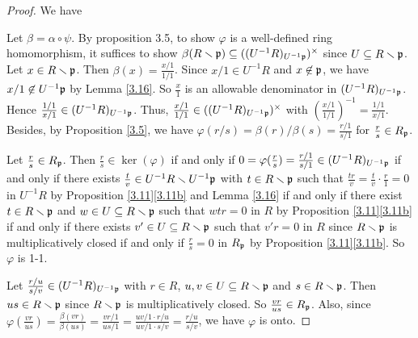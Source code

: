 \begin{proof}
    We have 
    \begin{center}
    \end{center}
    Let $\beta = \alpha \circ \psi$. By proposition 3.5, to show $\varphi$ is a well-defined ring homomorphism, it suffices to show $\beta(R \smallsetminus \mathfrak{p}) \subseteq ((U^{-1}R)_{U^{-1}\mathfrak{p}})^{\times}$ since $U \subseteq R \smallsetminus \mathfrak{p}$. Let $x \in R \smallsetminus \mathfrak{p}$. Then $\beta(x) = \frac{x/1}{1/1}$. Since $x/1 \in U^{-1}R$ and $x \not \in \mathfrak{p}$, we have $x/1 \not \in U^{-1}\mathfrak{p}$ by Lemma \ref{3.16}. So $\frac{x}{1}$ is an allowable denominator in $(U^{-1}R)_{U^{-1}\mathfrak{p}}$. Hence $\frac{1/1}{x/1} \in (U^{-1}R)_{U^{-1}\mathfrak{p}}$. Thus, $\frac{x/1}{1/1} \in ((U^{-1}R)_{U^{-1}\mathfrak{p}})^{\times}$ with $(\frac{x/1}{1/1})^{-1} = \frac{1/1}{x/1}$. Besides, by Proposition \ref{3.5}, we have $\varphi(r/s) = \beta(r)/\beta(s) = \frac{r/1}{s/1}$ for $\frac{r}{s} \in R_{\mathfrak{p}}$. \par 
    Let $\frac{r}{s} \in R_{\mathfrak{p}}$. Then $\frac{r}{s} \in \ker(\varphi)$ if and only if $0 = \varphi(\frac{r}{s}) = \frac{r/1}{s/1} \in (U^{-1}R)_{U^{-1}\mathfrak{p}}$ if and only if there exists $\frac{t}{v} \in U^{-1}R \smallsetminus U^{-1}\mathfrak{p}$ with $t \in R \smallsetminus \mathfrak{p}$ such that $\frac{tr}{v} = \frac{t}{v} \cdot \frac{r}{1} = 0$ in $U^{-1}R$ by Proposition \ref{3.11}\ref{3.11b} and Lemma \ref{3.16} if and only if there exist $t \in R \smallsetminus \mathfrak{p}$ and $w \in U \subseteq R \smallsetminus \mathfrak{p}$ such that $wtr = 0$ in $R$ by Proposition \ref{3.11}\ref{3.11b} if and only if there exists $v' \in U \subseteq R \smallsetminus \mathfrak{p}$ such that $v'r = 0$ in $R$ since $R \smallsetminus \mathfrak{p}$ is multiplicatively closed if and only if $\frac{r}{s} = 0$ in $R_{\mathfrak{p}}$ by Proposition \ref{3.11}\ref{3.11b}. So $\varphi$ is 1-1. \par 
    Let $\frac{r/u}{s/v} \in (U^{-1}R)_{U^{-1}\mathfrak{p}}$ with $r \in R$, $u,v \in U \subseteq R \smallsetminus \mathfrak{p}$ and $s \in R \smallsetminus \mathfrak{p}$. Then $us \in R \smallsetminus \mathfrak{p}$ since $R \smallsetminus \mathfrak{p}$ is multiplicatively closed. So $\frac{vr}{us} \in R_{\mathfrak{p}}$. Also, since $\varphi(\frac{vr}{us}) = \frac{\beta(vr)}{\beta(us)} = \frac{vr/1}{us/1} = \frac{uv/1 \cdot r/u}{uv/1 \cdot s/v} = \frac{r/u}{s/v}$, we have $\varphi$ is onto. 
\end{proof}

